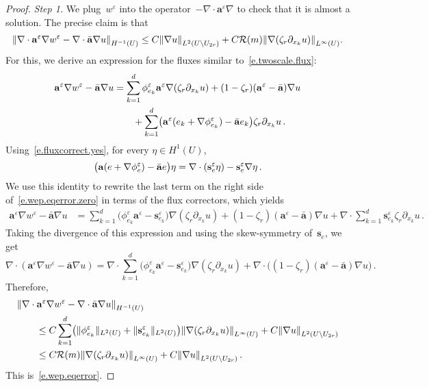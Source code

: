 \documentclass[11pt]{article} %
\numberwithin{equation}{section}
\theoremstyle{definition}
\let\originalleft\left
\let\originalright\right
\renewcommand{\left}{\mathopen{}\mathclose\bgroup\originalleft}
\renewcommand{\right}{\aftergroup\egroup\originalright}
\newcommand{\eps}{\varepsilon}
\newcommand{\s}{\mathbf{s}}
\newcommand{\ep}{\eps}
\renewcommand{\a}{\mathbf{a}}
\newcommand{\ahom}{\bar{\a}}
\begin{document}
\begin{proof}
\emph{Step 1.} We plug~$w^\ep$ into the operator~$-\nabla \cdot \a^\ep \nabla$ to check that it is almost a solution. The precise claim is that
\begin{align}
\label{e.wep.eqerror}
\left\| 
\nabla \cdot \a^\ep \nabla w^\ep - \nabla \cdot \ahom \nabla u 
\right\|_{H^{-1}(U)}
\leq C \left\| \nabla u \right\|_{L^2(U \setminus U_{2r})}
+ 
C \mathcal{R}( m ) \left\| \nabla (\zeta_r \partial_{x_k} u) \right\|_{L^\infty(U)}  
. 
\end{align}
For this, we derive an expression for the fluxes similar to~\eqref{e.twoscale.flux}:
\begin{align}  \label{e.wep.eqerror.zero}
\a^\ep \nabla w^\ep - \ahom \nabla u
& =
\sum_{k=1}^d 
\phi_{e_k}^\ep \a^\ep \nabla (\zeta_r \partial_{x_k} u) 
+
(1-\zeta_r)(\a^\ep - \ahom) \nabla u 
\notag \\  &
\qquad + \sum_{k=1}^d \left( \a^\ep (e_k + \nabla \phi_{e_k}^\ep) - \ahom e_k \right) \zeta_r \partial_{x_k} u
\,.
\end{align}
Using~\eqref{e.fluxcorrect.yes}, for every $\eta \in H^1(U)$, 
\begin{equation}
\label{e.wep.eqerror.three}
\bigl( \a(e+\nabla\phi_{e}^\ep) - \ahom e \bigr) \eta 
=
 \nabla \cdot \left( \s_{e}^\ep \eta \right) - 
\mathbf{s}_{e}^\ep \nabla \eta
\,.
\end{equation}
We use this identity to rewrite the last term on the right side of~\eqref{e.wep.eqerror.zero} in terms of the flux correctors, which yields 
\begin{align}
\label{e.wep.eqerror.zero.2}
\a^\ep \nabla w^\ep {-} \ahom \nabla u
& =
\sum_{k=1}^d 
\bigl( \phi_{e_k}^\ep \a^\ep  {-} \s_{e_k}^\ep \bigr) \nabla (\zeta_r \partial_{x_k} u) 
{+}
(1{-}\zeta_r)(\a^\ep {-} \ahom) \nabla u 
 {+} \nabla \cdot \sum_{k=1}^d \s_{e_k}^\ep \zeta_r \partial_{x_k} u
\,.
\end{align}
Taking the divergence of this expression and using the skew-symmetry of~$\s_e$, we get
\begin{equation}
\label{e.wep.eqerror.zero.2.div}
\nabla \cdot ( \a^\ep \nabla w^\ep {-} \ahom \nabla u )
=
\nabla \cdot \sum_{k=1}^d 
\bigl( \phi_{e_k}^\ep \a^\ep  {-} \s_{e_k}^\ep \bigr) \nabla (\zeta_r \partial_{x_k} u) 
{+}
\nabla \cdot \bigl( (1{-}\zeta_r)(\a^\ep {-} \ahom) \nabla u  \bigr)
\,.
\end{equation}
Therefore, 
\begin{align} \notag
\lefteqn{
\left\| 
\nabla \cdot \a^\ep \nabla w^\ep - \nabla \cdot \ahom \nabla u 
\right\|_{H^{-1}(U)}
} \qquad &
\\ 
\notag &
\leq
C \sum_{k=1}^d \bigl( \| \phi_{e_k}^\ep \|_{L^2(U)} + \| \s_{e_k}^\ep \|_{L^2(U)} \bigr) 
\left\| \nabla (\zeta_r \partial_{x_k} u) \right\|_{L^\infty(U)} + C \left\| \nabla u \right\|_{L^2(U \setminus U_{2r})}
\\ \notag & 
\leq
C \mathcal{R}(m) \left\| \nabla (\zeta_r \partial_{x_k} u) \right\|_{L^\infty(U)} + C \left\| \nabla u \right\|_{L^2(U \setminus U_{2r})}
\,.
\end{align}
This is~\eqref{e.wep.eqerror}.
\smallskip


\end{proof}
\end{document}
